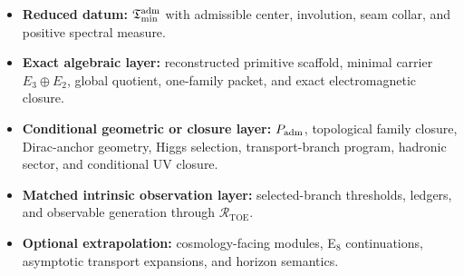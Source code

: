 \begin{tcolorbox}[colback=tfptblue!2, colframe=tfptblue!40, breakable,
    title={Datum Hierarchy for the Present Draft}, colbacktitle=tfptblue!60]
\begin{itemize}[leftmargin=1.5em, topsep=3pt, itemsep=3pt]
    \item \textbf{Reduced datum:} $\mathfrak T_{\mathrm{min}}^{\mathrm{adm}}$ with admissible center, involution, seam collar, and positive spectral measure.
    \item \textbf{Exact algebraic layer:} reconstructed primitive scaffold, minimal carrier $E_3\oplus E_2$, global quotient, one-family packet, and exact electromagnetic closure.
    \item \textbf{Conditional geometric or closure layer:} $P_{\mathrm{adm}}$, topological family closure, Dirac-anchor geometry, Higgs selection, transport-branch program, hadronic sector, and conditional UV closure.
    \item \textbf{Matched intrinsic observation layer:} selected-branch thresholds, ledgers, and observable generation through $\mathcal R_{\mathrm{TOE}}$.
    \item \textbf{Optional extrapolation:} cosmology-facing modules, E$_8$ continuations, asymptotic transport expansions, and horizon semantics.
\end{itemize}
\end{tcolorbox}

